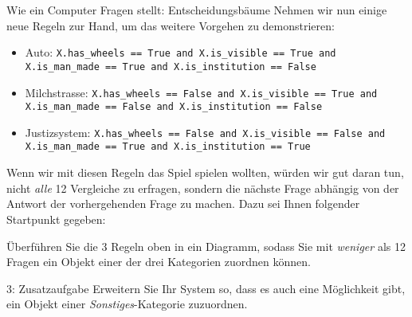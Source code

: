 \begin{lpu}{Wie ein Computer Fragen stellt: Entscheidungsbäume}
Nehmen wir nun einige neue Regeln zur Hand, um das weitere Vorgehen zu demonstrieren:

\begin{itemize}
    \item Auto: \texttt{X.has\_wheels == True and X.is\_visible == True and X.is\_man\_made == True and X.is\_institution == False}
    \item Milchstrasse: \texttt{X.has\_wheels == False and X.is\_visible == True and X.is\_man\_made == False and X.is\_institution == False}
    \item Justizsystem: \texttt{X.has\_wheels == False and X.is\_visible == False and X.is\_man\_made == True and X.is\_institution == True} 
\end{itemize}

Wenn wir mit diesen Regeln das Spiel spielen wollten, würden wir gut daran tun, nicht \textit{alle} 12 Vergleiche zu erfragen, sondern die nächste Frage abhängig von der Antwort der vorhergehenden Frage zu machen. Dazu sei Ihnen folgender Startpunkt gegeben:

\begin{center}
\end{center}

\begin{aufgabe}{3}
Überführen Sie die 3 Regeln oben in ein Diagramm, sodass Sie mit \textit{weniger} als 12 Fragen ein Objekt einer der drei Kategorien zuordnen können.
\end{aufgabe}


\begin{aufgabe}{3: Zusatzaufgabe}
Erweitern Sie Ihr System so, dass es auch eine Möglichkeit gibt, ein Objekt einer \textit{Sonstiges}-Kategorie zuzuordnen.
\end{aufgabe}


\end{lpu}
